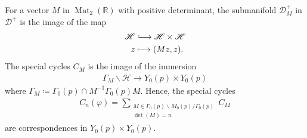 \documentclass[11pt]{article} %
\newcommand{\8}{\infty}
\newcommand{\D}{\mathcal{D}}
\newcommand{\HH}{\mathscr{H}}
\newcommand{\R}{\mathbb{R}}
\newcommand{\Mat}{\operatorname{Mat}}
\newcommand{\hooklongrightarrow}{\lhook\joinrel\longrightarrow}
\theoremstyle{mytheoremstyle}
\theoremstyle{remark}
\numberwithin{equation}{section}
\begin{document}
\subsubsection{} For a vector $M$ in $\Mat_2(\R)$ with positive determinant, the submanifold $\D^+_M$ in $\D^+$ is the image of the map
\begin{align}
    \HH & \hooklongrightarrow \HH \times \HH \nonumber \\
    z & \longmapsto (Mz,z).
\end{align} The special cycles $C_M$ is the image of the immersion
\begin{align}
    \Gamma_M \backslash \HH \longrightarrow Y_0(p) \times Y_0(p)
\end{align}
where $\Gamma_M \coloneqq \Gamma_0(p) \cap M^{-1} \Gamma_0(p) M$. Hence, the special cycles
\begin{align}
    C_n(\varphi)=\sum_{\substack{{M \in \Gamma_0(p) \backslash M_0(p) / \Gamma_0(p)} \\ \det (M)=n}} C_M
\end{align}
are correspondences in $Y_0(p) \times Y_0(p)$.
\end{document}
